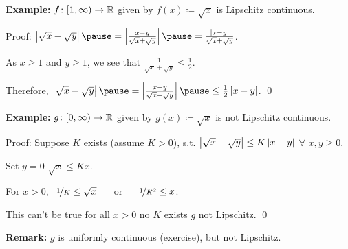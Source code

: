 \documentclass[10pt,aspectratio=149]{beamer}
\begin{document}
\begin{frame}
\textbf{Example:}
$f \colon [1,\infty) \to {\mathbb{R}}$ given by $f(x) \coloneqq \sqrt{x}$
is Lipschitz continuous.

\pause
\medskip

Proof:
$
\abs{\sqrt{x}-\sqrt{y}}
\pause
= 
\abs{\frac{x-y}{\sqrt{x}+\sqrt{y}}}
\pause
=
\frac{\abs{x-y}}{\sqrt{x}+\sqrt{y}}$.

\pause
\medskip

As $x \geq 1$ and $y \geq 1$, we see that $\frac{1}{\sqrt{x}+\sqrt{y}}
\leq \frac{1}{2}$.

\pause
Therefore, \quad
$\abs{\sqrt{x}-\sqrt{y}}
\pause
= 
\abs{\frac{x-y}{\sqrt{x}+\sqrt{y}}}
\pause
\leq
\frac{1}{2}
\abs{x-y}$.
\qed

\pause
\medskip

\textbf{Example:}
$g \colon [0,\infty) \to {\mathbb{R}}$ given by
$g(x) \coloneqq \sqrt{x}$ is not Lipschitz continuous.

\pause
\medskip

Proof:  Suppose $K$ exists (assume $K>0$), s.t. 
$\left\lvert {\sqrt{x}-\sqrt{y}} \right\rvert 
\leq
K \left\lvert {x-y} \right\rvert$ $\forall$ $x,y \geq 0$.

\pause
\medskip

Set $y=0$ \wthus $\sqrt{x} \leq K x$.

\pause
For $x > 0$, ~$\nicefrac{1}{K} \leq \sqrt{x}$ ~~ or ~~ $\nicefrac{1}{K^2} \leq x$.

\pause
This can't be true for all $x > 0$ \wthus no $K$ exists
\pause
\wthus
$g$ not Lipschitz.
\qed

\pause
\medskip

\textbf{Remark:} $g$ is uniformly continuous (exercise), but not Lipschitz.

\end{frame}
\end{document}
